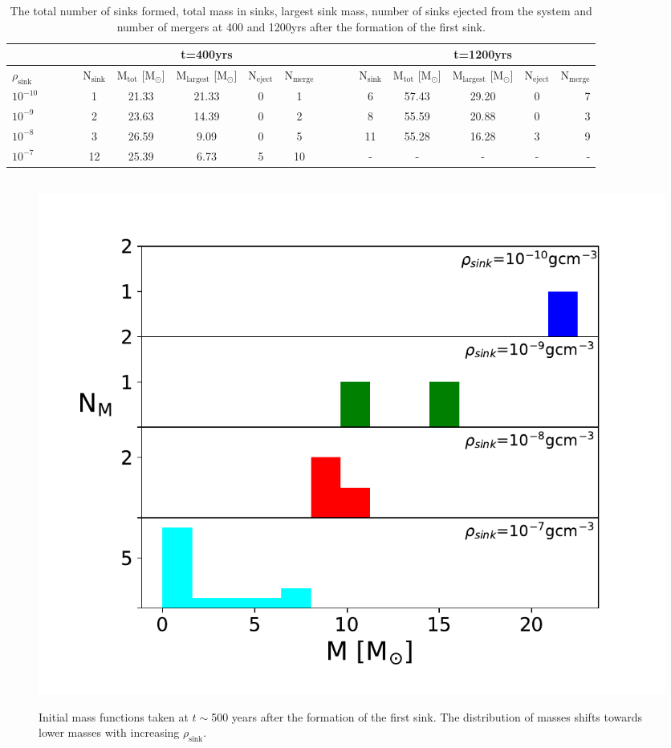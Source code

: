 \documentclass[fleqn,usenatbib]{mnras}
\begin{document}
\begin{table}
	\centering
	\caption{The total number of sinks formed, total mass in sinks, largest sink mass, number of sinks ejected from the system and number of mergers at 400 and 1200yrs after the formation of the first sink.}
	\label{table:2}
	\begin{tabular}{l c c c c c c c c c c c c c c c r } %
		\hline
		& & & & & &  t=400yrs & & &  & & & & & t=1200yrs & \\
		\hline
		$\rho_{\text{sink}}$  & & & & N$_{\text{sink}}$ & M$_{\text{tot}}$ [M$_{\odot}$] & M$_{\text{largest}}$ [M$_{\odot}$] & N$_{\text{eject}}$ & N$_{\text{merge}}$ & & & & N$_{\text{sink}}$ & M$_{\text{tot}}$ [M$_{\odot}$] & M$_{\text{largest}}$ [M$_{\odot}$]  & N$_{\text{eject}}$ & N$_{\text{merge}}$ \\
		\hline
		$10^{-10}$  & & & & 1  & 21.33 &  21.33   & 0 &  1   & & &  & 6  &  57.43 &  29.20   &  0  &  7 \\
		$10^{-9}$   & & & &  2 & 23.63 &  14.39  & 0 & 2   & & & &  8  &  55.59 &    20.88   &0  &  3 \\
		$10^{-8}$    & & & &  3 & 26.59 &   9.09  & 0 & 5   & & & &  11 &  55.28 &    16.28   &3  &  9  \\
		$10^{-7}$  &  & & & 12 & 25.39 &   6.73  & 5 & 10 & & &  & -  &  -         &     -    & -  &  - \\
		\hline
	\end{tabular}
\end{table}


\begin{figure}
	 \hbox{\hspace{-0.5cm} \includegraphics[scale=0.5]{IMF1.pdf}}
    \caption{Initial mass functions taken at $t\sim$500 years after the formation of the first sink. The distribution of masses shifts towards lower masses with increasing $\rho_{\text{sink}}$.}
    \label{fig:IMF}
\end{figure}
 
\end{document}
